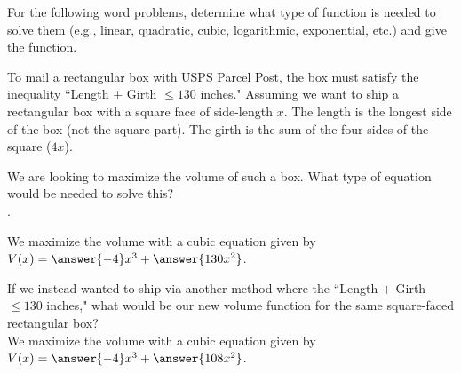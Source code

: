 \documentclass{ximera}
\author{Elizabeth Campolongo}
\begin{document}
\begin{exercise}
For the following word problems, determine what type of function is needed to solve them (e.g., linear, quadratic, cubic, logarithmic, exponential, etc.) and give the function. 
%



\item To mail a rectangular box with USPS Parcel Post, the box must satisfy the inequality ``Length $+$ Girth $\leq 130$ inches." Assuming we want to ship a rectangular box with a square face of side-length $x$. The length is the longest side of the box (not the square part). The girth is the sum of the four sides of the square ($4x$).

We are looking to maximize the volume of such a box. What type of equation would be needed to solve this?\\
.
%
\begin{exercise}
We maximize the volume with a cubic equation given by $V(x) = \answer{-4}x^3+\answer{130x^2}$.
\begin{exercise}
If we instead wanted to ship via another method where the ``Length $+$ Girth $\leq 130$ inches," what would be our new volume function for the same square-faced rectangular box?\\
We maximize the volume with a cubic equation given by $V(x) = \answer{-4}x^3+\answer{108x^2}$.
\end{exercise}
\end{exercise}


\end{exercise}
\end{document}

